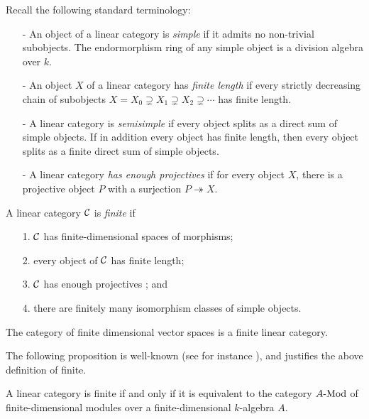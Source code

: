\documentclass{amsart}
\begin{document}
Recall the following standard terminology:
\begin{itemize}
	\item[-] An object of a linear category is {\em simple} if it admits no non-trivial subobjects. The endormorphism ring of any simple object is a division algebra over $k$. 
	\item[-] An object $X$ of a linear category has {\em finite length} if every strictly decreasing chain of subobjects $X = X_0 \supsetneq X_1 \supsetneq X_2 \supsetneq  \cdots$ has finite length. 
	\item[-] A linear category is {\em semisimple} if every object splits as a direct sum of simple objects. If in addition every object has finite length, then every object splits as a finite direct sum of simple objects.
	\item[-] A linear category {\em has enough projectives} if for every object $X$, there is a projective object $P$ with a surjection $P \twoheadrightarrow X$. 
\end{itemize}


\begin{definition} %
	A linear category $\mathcal C$ is {\em finite} if 
	\begin{enumerate}
		\item[1.] $\mathcal C$ has finite-dimensional spaces of morphisms;
		\item[2.] every object of $\mathcal C$ has finite length;
		\item[3.] $\mathcal C$ has enough projectives%
		; and
		\item[4.] there are finitely many isomorphism classes of simple objects.  
	\end{enumerate}
\end{definition}

\begin{example}
	The category of finite dimensional vector spaces is a finite linear category. 
\end{example}


The following proposition is well-known (see for instance \cite[\S9.6]{MR2808160}), and justifies the above definition of finite.

\begin{proposition} \label{prop:finitelinearcatsasmodules}
A linear category is finite if and only if it is equivalent to the category $\Mod{A}{}$ of finite-dimensional modules over a finite-dimensional $k$-algebra $A$.
\end{proposition}
\end{document}
